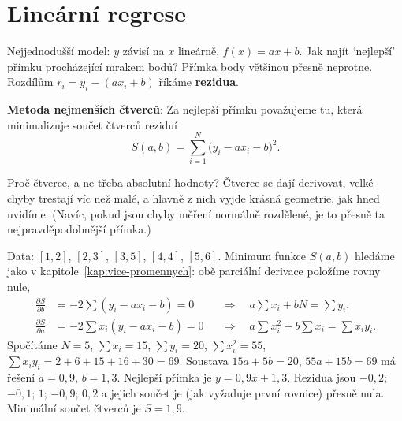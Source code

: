 \section{Lineární regrese}

Nejjednodušší model: $y$ závisí na $x$ lineárně, $f(x) = ax + b$. Jak najít `nejlepší' přímku procházející mrakem bodů? Přímka body většinou přesně neprotne. Rozdílům $r_i = y_i - (ax_i + b)$ říkáme \textbf{rezidua}.

\begin{definitionbox}
  \textbf{Metoda nejmenších čtverců}: Za nejlepší přímku považujeme tu, která minimalizuje součet čtverců reziduí
  \begin{equation*}
    S(a, b) = \sum_{i=1}^{N}{\big(y_i - ax_i - b\big)}^2.
  \end{equation*}
\end{definitionbox}

Proč čtverce, a ne třeba absolutní hodnoty? Čtverce se dají derivovat, velké chyby trestají víc než malé, a hlavně z nich vyjde krásná geometrie, jak hned uvidíme. (Navíc, pokud jsou chyby měření normálně rozdělené, je to přesně ta nejpravděpodobnější přímka.)

\begin{example}
  Data: $[1, 2]$, $[2, 3]$, $[3, 5]$, $[4, 4]$, $[5, 6]$. Minimum funkce $S(a, b)$ hledáme jako v kapitole~\ref{kap:vice-promennych}: obě parciální derivace položíme rovny nule,
  \begin{align*}
    \frac{\partial S}{\partial b} &= -2\sum(y_i - ax_i - b) = 0 &&\Longrightarrow\quad a\sum x_i + bN = \sum y_i,\\
    \frac{\partial S}{\partial a} &= -2\sum x_i(y_i - ax_i - b) = 0 &&\Longrightarrow\quad a\sum x_i^2 + b\sum x_i = \sum x_iy_i.
  \end{align*}
  Spočítáme $N = 5$, $\sum x_i = 15$, $\sum y_i = 20$, $\sum x_i^2 = 55$, $\sum x_iy_i = 2 + 6 + 15 + 16 + 30 = 69$. Soustava $15a + 5b = 20$, $55a + 15b = 69$ má řešení $a = 0{,}9$, $b = 1{,}3$. Nejlepší přímka je $y = 0{,}9x + 1{,}3$. Rezidua jsou $-0{,}2$; $-0{,}1$; $1$; $-0{,}9$; $0{,}2$ a jejich součet je (jak vyžaduje první rovnice) přesně nula. Minimální součet čtverců je $S = 1{,}9$.
\end{example}

\begin{center}
\end{center}


